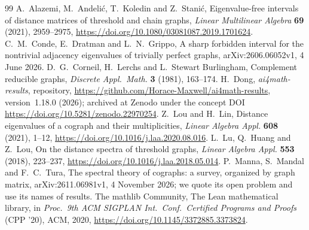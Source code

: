 \documentclass[11pt]{article}
\theoremstyle{remark}
\newcommand{\repoversion}{1.18.0}
\begin{document}
{\small
\begin{thebibliography}{99}
A.~Alazemi, M.~Andeli\'c, T.~Koledin and Z.~Stani\'c, Eigenvalue-free
intervals of distance matrices of threshold and chain graphs, \emph{Linear
Multilinear Algebra} \textbf{69} (2021), 2959--2975,
\url{https://doi.org/10.1080/03081087.2019.1701624}.
C.~M.~Conde, E.~Dratman and L.~N.~Grippo, A sharp forbidden interval for the
nontrivial adjacency eigenvalues of trivially perfect graphs,
arXiv:2606.06052v1, 4 June 2026.
D.~G.~Corneil, H.~Lerchs and L.~Stewart Burlingham, Complement reducible
graphs, \emph{Discrete Appl.\ Math.} \textbf{3} (1981), 163--174.
H.~Dong, \emph{ai4math-results}, repository,
\url{https://github.com/Horace-Maxwell/ai4math-results}, version~\repoversion{}
(2026); archived at Zenodo under the concept DOI
\url{https://doi.org/10.5281/zenodo.22970254}.
Z.~Lou and H.~Lin, Distance eigenvalues of a cograph and their multiplicities,
\emph{Linear Algebra Appl.} \textbf{608} (2021), 1--12,
\url{https://doi.org/10.1016/j.laa.2020.08.016}.
L.~Lu, Q.~Huang and Z.~Lou, On the distance spectra of threshold graphs,
\emph{Linear Algebra Appl.} \textbf{553} (2018), 223--237,
\url{https://doi.org/10.1016/j.laa.2018.05.014}.
P.~Manna, S.~Mandal and F.~C.~Tura, The spectral theory of cographs: a survey,
organized by graph matrix, arXiv:2611.06981v1, 4 November 2026; we quote its
open problem and use its names of results.
The mathlib Community, The Lean mathematical library, in \emph{Proc.\ 9th ACM
SIGPLAN Int.\ Conf.\ Certified Programs and Proofs} (CPP '20), ACM, 2020,
\url{https://doi.org/10.1145/3372885.3373824}.
\end{thebibliography}}
\end{document}
